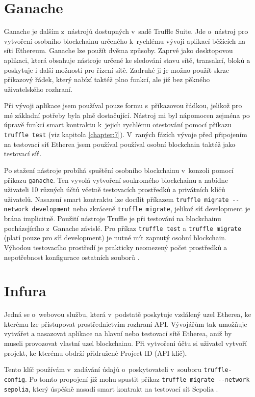 \section{Ganache}
Ganache je dalším z~nástrojů dostupných v~sadě Truffle Suite. Jde o~nástroj pro vytvoření osobního blockchainu určeného k~rychlému vývoji aplikací běžících na síti Ethereum. Ganache lze použít dvěma způsoby. Zaprvé jako desktopovou aplikaci, která obsahuje nástroje určené ke sledování stavu sítě, transakcí, bloků a poskytuje i další možnosti pro řízení sítě. Zadruhé ji je možno použít skrze příkazový řádek, který nabízí taktéž plno funkcí, ale již bez pěkného uživatelského rozhraní. 

Při vývoji aplikace jsem používal pouze formu s~příkazovou řádkou, jelikož pro mé základní potřeby byla plně dostačující. Nástroj mi byl nápomocen zejména po úpravě funkcí smart kontraktu k~jejich rychlému otestování pomocí příkazu \texttt{truffle test} (viz kapitola \ref{chapter:7}). V~raných fázích vývoje před připojením na testovací síť Etherea jsem používal používal osobní blockchain taktéž jako testovací síť. 

Po stažení nástroje probíhá spuštění osobního blockchainu v~konzoli pomocí příkazu \texttt{ganache}. Ten vyvolá vytvoření soukromého blockchainu a nabídne uživateli 10 různých účtů včetně testovacích prostředků a privátních klíčů uživatelů. Nasazení smart kontraktu lze docílit příkazem \texttt{truffle migrate -{}-network development} nebo zkráceně \texttt{truffle migrate}, jelikož síť development je brána implicitně. Použití nástroje Truffle je při testování na blockchainu pocházejícího z~Ganache závislé. Pro příkaz \texttt{truffle test} a \texttt{truffle migrate} (platí pouze pro síť development) je nutné mít zapnutý osobní blockchain. Výhodou testovacího prostředí je prakticky neomezený počet prostředků a nepotřebnost konfigurace ostatních souborů \cite{ganache}.
 
\section{Infura}
\label{infura}
Jedná se o~webovou službu, která v~podstatě poskytuje vzdálený uzel Etherea, ke kterému lze přistupovat prostřednictvím rozhraní API. Vývojářům tak umožňuje vytvářet a nasazovat aplikace na hlavní nebo testovací sítě Etherea, aniž by museli provozovat vlastní uzel blockchainu. Při vytvoření účtu si uživatel vytvoří projekt, ke kterému obdrží přidružené Project ID (API klíč).

Tento klíč používám v~zadávání údajů o~poskytovateli v~souboru \texttt{truffle-config}. Po tomto propojení již mohu spustit příkaz \texttt{truffle migrate -{}-network sepolia}, který úspěšně nasadí smart kontrakt na testovací síť Sepolia \cite{infura}.

